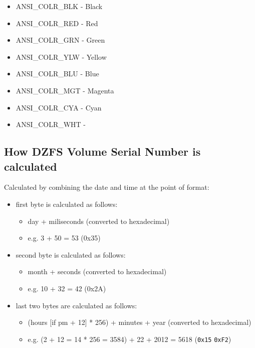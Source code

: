 \documentclass[a4paper,11pt]{article}
\begin{document}
    \begin{itemize}
        \item ANSI\_COLR\_BLK - Black
        \item ANSI\_COLR\_RED - {\color{red}Red}
        \item ANSI\_COLR\_GRN - {\color{green}Green}
        \item ANSI\_COLR\_YLW - {\color{yellow}Yellow}
        \item ANSI\_COLR\_BLU - {\color{blue}Blue}
        \item ANSI\_COLR\_MGT - {\color{magenta}Magenta}
        \item ANSI\_COLR\_CYA - {\color{cyan}Cyan}
        \item ANSI\_COLR\_WHT -
    \end{itemize}

    \subsection{How DZFS Volume Serial Number is calculated}
    Calculated by combining the date and time at the point of format:

    \begin{itemize}
        \item first byte is calculated as follows:
        \begin{itemize}
            \item day + miliseconds (converted to hexadecimal)
            \item e.g. 3 + 50 = 53 (0x35)
        \end{itemize}
        \item second byte is calculated as follows:
        \begin{itemize}
            \item month + seconds (converted to hexadecimal)
            \item e.g. 10 + 32 = 42 (0x2A)
        \end{itemize}
        \item last two bytes are calculated as follows:
        \begin{itemize}
            \item (hours [if pm + 12] * 256) + minutes + year (converted to
            hexadecimal)
            \item e.g. (2 + 12 = 14 * 256 = 3584) + 22 + 2012 = 5618
            (\texttt{0x15} \texttt{0xF2})
        \end{itemize}
    \end{itemize}
\end{document}
